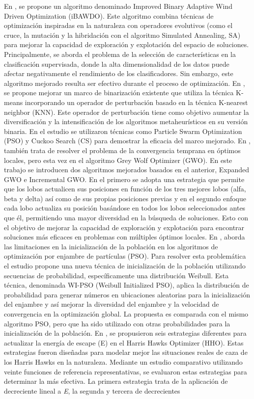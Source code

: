 En \cite{ABDELMAGEED2022107904}, se propone un algoritmo denominado Improved Binary Adaptive Wind Driven Optimization (iBAWDO). Este algoritmo combina técnicas de optimización inspiradas en la naturaleza con operadores evolutivos (como el cruce, la mutación y la hibridación con el algoritmo Simulated Annealing, SA) para mejorar la capacidad de exploración y explotación del espacio de soluciones. Principalmente, se aborda el problema de la selección de características en la clasificación supervisada, donde la alta dimensionalidad de los datos puede afectar negativamente el rendimiento de los clasificadores. Sin embargo, este algoritmo mejorado resulta ser efectivo durante el proceso de optimización. En \cite{garcia2020enhancing}, se propone mejorar un marco de binarización existente que utiliza la técnica K-means incorporando un operador de perturbación basado en la técnica K-nearest neighbor (KNN). Este operador de perturbación tiene como objetivo aumentar la diversificación y la intensificación de los algoritmos metaheurísticos en su versión binaria. En el estudio se utilizaron técnicas como Particle Swarm Optimization (PSO) y Cuckoo Search (CS) para demostrar la eficacia del marco mejorado. En \cite{seyyedabbasi2021gwo}, también trata de resolver el problema de la convergencia temprana en óptimos locales, pero esta vez en el algoritmo Grey Wolf Optimizer (GWO). En este trabajo se introducen dos algoritmos mejorados basados en el anterior, Expanded GWO e Incremental GWO. En el primero se adopta una estrategia que permite que los lobos actualicen sus posiciones en función de los tres mejores lobos (alfa, beta y delta) así como de sus propias posiciones previas y en el segundo enfoque cada lobo actualiza su posición basándose en todos los lobos seleccionados antes que él, permitiendo una mayor diversidad en la búsqueda de soluciones. Esto con el objetivo de mejorar la capacidad de exploración y explotación para encontrar soluciones más eficaces en problemas con múltiples óptimos locales. En \cite{rauf2020particle}, aborda las limitaciones en la inicialización de la población en los algoritmos de optimización por enjambre de partículas (PSO). Para resolver esta problemática el estudio propone una nueva técnica de inicialización de la población utilizando secuencias de probabilidad, específicamente una distribución Weibull. Esta técnica, denominada WI-PSO (Weibull Initialized PSO), aplica la distribución de probabilidad para generar números en ubicaciones aleatorias para la inicialización del enjambre y así  mejorar la diversidad del enjambre y la velocidad de convergencia en la optimización global. La propuesta es comparada con el mismo algoritmo PSO, pero que ha sido utilizado con otras probabilidades para la inicialización de la población. En \cite{zhang2020modified}, se propusieron seis estrategias diferentes para actualizar la energía de escape (E) en el Harris Hawks Optimizer (HHO). Estas estrategias fueron diseñadas para modelar mejor las situaciones reales de caza de los Harris Hawks en la naturaleza. Mediante un estudio comparativo utilizando veinte funciones de referencia representativas, se evaluaron estas estrategias para determinar la más efectiva. La primera estrategia trata de la aplicación de decreciente lineal a \textit{E}, la segunda y tercera de decrecientes 